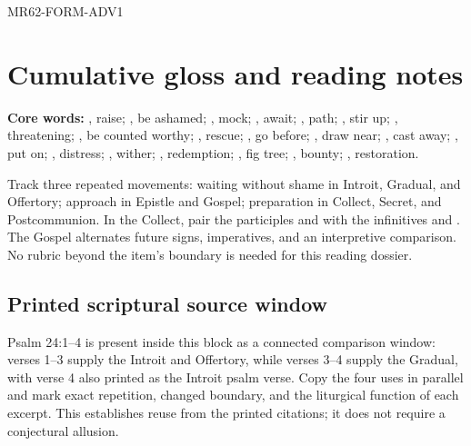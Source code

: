 \begin{reviewsourceunit}{MR62-FORM-ADV1}
\section{Cumulative gloss and reading notes}
\textbf{Core words:} , raise; , be ashamed;
, mock; , await; , path;
, stir up; , threatening; , be
counted worthy; , rescue; , go before;
, draw near; , cast away; , put
on; , distress; , wither; ,
redemption; , fig tree; , bounty;
, restoration.

Track three repeated movements: waiting without shame in Introit, Gradual, and
Offertory; approach in Epistle and Gospel; preparation in Collect, Secret, and
Postcommunion.  In the Collect, pair the participles  and
 with the infinitives  and .
The Gospel alternates future signs, imperatives, and an interpretive comparison.
No rubric beyond the item's boundary is needed for this reading dossier.

\subsection*{Printed scriptural source window}
Psalm 24:1--4 is present inside this block as a connected comparison window:
verses 1--3 supply the Introit and Offertory, while verses 3--4 supply the
Gradual, with verse 4 also printed as the Introit psalm verse.  Copy the four
uses in parallel and mark exact repetition, changed boundary, and the liturgical
function of each excerpt.  This establishes reuse from the printed citations;
it does not require a conjectural allusion.
\end{reviewsourceunit}

